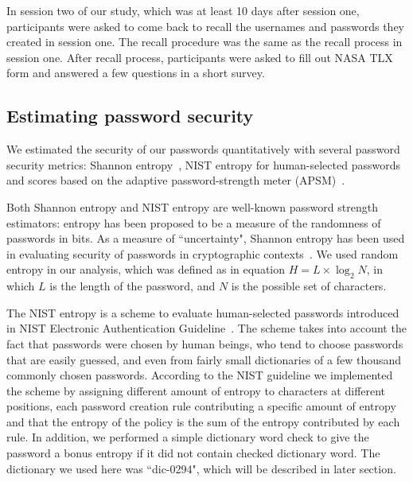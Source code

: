 \documentclass[conference]{IEEEtran}
\begin{document}
In session two of our study, which was at least 10 days after session one, participants were asked to come back to recall the usernames and passwords they created in session one. The recall procedure was the same as the recall process in session one. After recall process, participants were asked to fill out NASA TLX form and answered a few questions in a short survey.
 
\subsection{Estimating password security}

We estimated the security of our passwords quantitatively with several password security metrics: Shannon entropy~\cite{Shannon:2001:MTC:584091.584093, 394764}, NIST entropy for human-selected passwords~\cite{Burr:2011:SEA:2206278} and scores based on the adaptive password-strength meter (APSM)~\cite{Castelluccia:2012:NDSS:markov}. 


Both Shannon entropy and NIST entropy are well-known password strength estimators: entropy has been proposed to be a measure of the randomness of passwords in bits. As a measure of ``uncertainty", Shannon entropy has been used in evaluating security of passwords in cryptographic contexts~\cite{Burr:2011:SEA:2206278}. We used random entropy in our analysis, which was defined as in equation $H = L \times \log_{2} N$, in which $L$ is the length of the password, and $N$ is the possible set of characters.

The NIST entropy is a scheme to evaluate human-selected passwords introduced in NIST Electronic Authentication Guideline~\cite{Burr:2011:SEA:2206278}. The scheme takes into account the fact that passwords were chosen by human beings, who tend to choose passwords that are easily guessed, and even from fairly small dictionaries of a few thousand commonly chosen passwords. According to the NIST guideline we implemented the scheme by assigning different amount of entropy to characters at different positions, each password creation rule contributing a specific amount of entropy and that the entropy of the policy is the sum of the entropy contributed by each rule. In addition, we performed a simple dictionary word check to give the password a bonus entropy if it did not contain checked dictionary word. The dictionary we used here was ``dic-0294", which will be described in later section.
\end{document}

